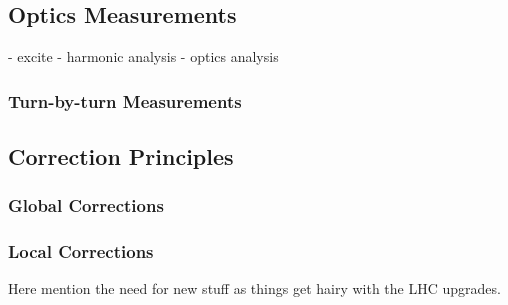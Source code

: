 \subsection{Optics Measurements}
\label{subsection:optics_measurements}

- excite
- harmonic analysis
- optics analysis

\subsubsection{Turn-by-turn Measurements}

\subsection{Correction Principles}

\subsubsection{Global Corrections}

\subsubsection{Local Corrections}

Here mention the need for new stuff as things get hairy with the LHC upgrades.